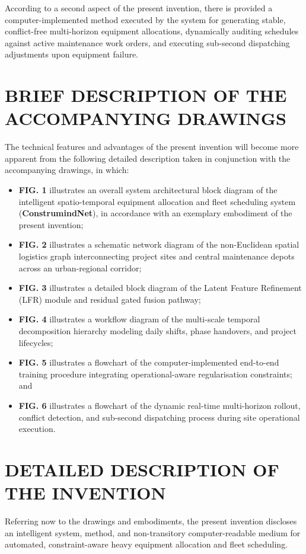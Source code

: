 \documentclass[11pt,a4paper]{article}
\begin{document}
\noindent According to a second aspect of the present invention, there is provided a computer-implemented method executed by the system for generating stable, conflict-free multi-horizon equipment allocations, dynamically auditing schedules against active maintenance work orders, and executing sub-second dispatching adjustments upon equipment failure.

\section{BRIEF DESCRIPTION OF THE ACCOMPANYING DRAWINGS}
\noindent The technical features and advantages of the present invention will become more apparent from the following detailed description taken in conjunction with the accompanying drawings, in which:

\begin{itemize}
    \item \textbf{FIG. 1} illustrates an overall system architectural block diagram of the intelligent spatio-temporal equipment allocation and fleet scheduling system (\textbf{ConstrumindNet}), in accordance with an exemplary embodiment of the present invention;
    \item \textbf{FIG. 2} illustrates a schematic network diagram of the non-Euclidean spatial logistics graph interconnecting project sites and central maintenance depots across an urban-regional corridor;
    \item \textbf{FIG. 3} illustrates a detailed block diagram of the Latent Feature Refinement (LFR) module and residual gated fusion pathway;
    \item \textbf{FIG. 4} illustrates a workflow diagram of the multi-scale temporal decomposition hierarchy modeling daily shifts, phase handovers, and project lifecycles;
    \item \textbf{FIG. 5} illustrates a flowchart of the computer-implemented end-to-end training procedure integrating operational-aware regularisation constraints; and
    \item \textbf{FIG. 6} illustrates a flowchart of the dynamic real-time multi-horizon rollout, conflict detection, and sub-second dispatching process during site operational execution.
\end{itemize}

\section{DETAILED DESCRIPTION OF THE INVENTION}
\noindent Referring now to the drawings and embodiments, the present invention discloses an intelligent system, method, and non-transitory computer-readable medium for automated, constraint-aware heavy equipment allocation and fleet scheduling.
\end{document}
